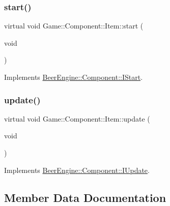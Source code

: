 \mbox{\label{class_game_1_1_component_1_1_item_a69276f0e6bbd44144a5618cfe89f526a}} 
\subsubsection{\texorpdfstring{start()}{start()}}
{\footnotesize\ttfamily virtual void Game\+::\+Component\+::\+Item\+::start (\begin{DoxyParamCaption}\item[{void}]{ }\end{DoxyParamCaption})\hspace{0.3cm}{\ttfamily [virtual]}}



Implements \mbox{\hyperlink{class_beer_engine_1_1_component_1_1_i_start_aa3e25e86e20c46cdaefc6f6d7f21e495}{Beer\+Engine\+::\+Component\+::\+I\+Start}}.

\mbox{\label{class_game_1_1_component_1_1_item_ac4e5deede6846817d6c818f8c8404fdc}} 
\subsubsection{\texorpdfstring{update()}{update()}}
{\footnotesize\ttfamily virtual void Game\+::\+Component\+::\+Item\+::update (\begin{DoxyParamCaption}\item[{void}]{ }\end{DoxyParamCaption})\hspace{0.3cm}{\ttfamily [virtual]}}



Implements \mbox{\hyperlink{class_beer_engine_1_1_component_1_1_i_update_aeeda0aa303175720e449b4c51d9867dd}{Beer\+Engine\+::\+Component\+::\+I\+Update}}.



\subsection{Member Data Documentation}
\mbox{\label{class_game_1_1_component_1_1_item_a8fc387420298a557380ec1d9a39c964c}} 
